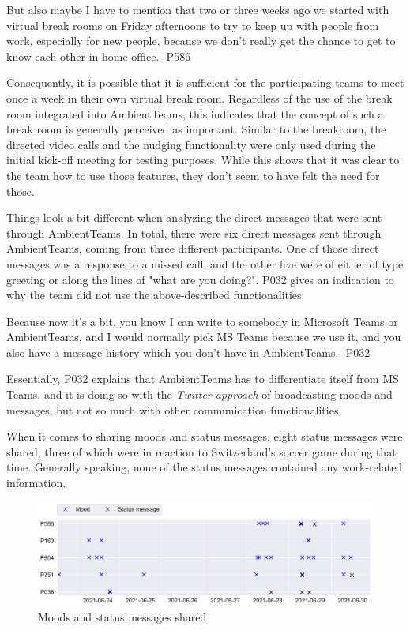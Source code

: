 \begin{displayquote}
    But also maybe I have to mention that two or three weeks ago we started with virtual break rooms on Friday afternoons to try to keep up with people from work, especially for new people, because we don't really get the chance to get to know each other in home office. -P586
\end{displayquote}

Consequently, it is possible that it is sufficient for the participating teams to meet once a week in their own virtual break room. Regardless of the use of the break room integrated into AmbientTeams, this indicates that the concept of such a break room is generally perceived as important. Similar to the breakroom, the directed video calls and the nudging functionality were only used during the initial kick-off meeting for testing purposes. While this shows that it was clear to the team how to use those features, they don't seem to have felt the need for those.

Things look a bit different when analyzing the direct messages that were sent through AmbientTeams. In total, there were six direct messages sent through AmbientTeams, coming from three different participants. One of those direct messages was a response to a missed call, and the other five were of either of type greeting or along the lines of "what are you doing?". P032 gives an indication to why the team did not use the above-described functionalities:

\begin{displayquote}
    Because now it's a bit, you know I can write to somebody in Microsoft Teams or AmbientTeams, and I would normally pick MS Teams because we use it, and you also have a message history which you don't have in AmbientTeams.
    -P032
\end{displayquote}

Essentially, P032 explains that AmbientTeams has to differentiate itself from MS Teams, and it is doing so with the \textit{Twitter approach} of broadcasting moods and messages, but not so much with other communication functionalities.

When it comes to sharing moods and status messages, eight status messages were shared, three of which were in reaction to Switzerland's soccer game during that time. Generally speaking, none of the status messages contained any work-related information.

\begin{figure}[h]
    \centering
    \includegraphics[width=\linewidth]{plots/moods_status_messages.pdf}
    \caption{Moods and status messages shared}
    \label{fig:moods_status_messages}
\end{figure}


